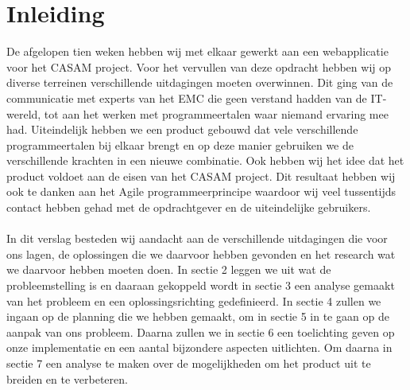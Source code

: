 \section{Inleiding}
\label{inleiding}
De afgelopen tien weken hebben wij met elkaar gewerkt aan een webapplicatie voor het CASAM project. Voor het vervullen van deze opdracht hebben wij op diverse terreinen verschillende uitdagingen moeten overwinnen. Dit ging van de communicatie met experts van het EMC die geen verstand hadden van de IT-wereld, tot aan het werken met programmeertalen waar niemand ervaring mee had. 
Uiteindelijk hebben we een product gebouwd dat vele verschillende programmeertalen bij elkaar brengt en op deze manier gebruiken we de verschillende krachten in een nieuwe combinatie. Ook hebben wij het idee dat het product voldoet aan de eisen van het CASAM project. Dit resultaat hebben wij ook te danken aan het Agile programmeerprincipe waardoor wij veel tussentijds contact hebben gehad met de opdrachtgever en de uiteindelijke gebruikers.
\\
\\
In dit verslag besteden wij aandacht aan de verschillende uitdagingen die voor ons lagen, de oplossingen die we daarvoor hebben gevonden en het research wat we daarvoor hebben moeten doen. In sectie 2 leggen we uit wat de probleemstelling is en daaraan gekoppeld wordt in sectie 3 een analyse gemaakt van het probleem en een oplossingsrichting gedefinieerd. In sectie 4 zullen we ingaan op de planning die we hebben gemaakt, om in sectie 5 in te gaan op de aanpak van ons probleem. Daarna zullen we in sectie 6 een toelichting geven op onze implementatie en een aantal bijzondere aspecten uitlichten. Om daarna in sectie 7 een analyse te maken over de mogelijkheden om het product uit te breiden en te verbeteren. 

